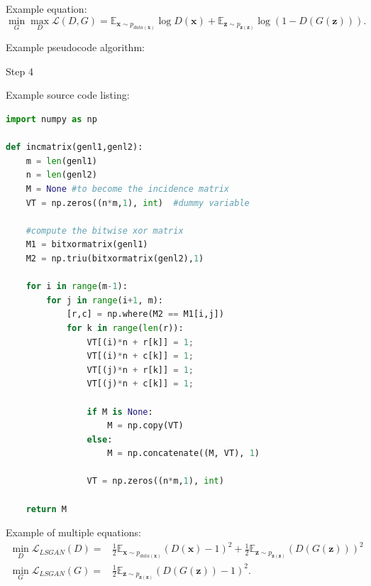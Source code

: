 \documentclass[12pt]{report} %
\begin{document}
Example equation:
\begin{equation} \label{eq:1}
    \min_{G} \max_{D} \mathcal{L}(D, G) = \mathbb{E}_{\boldsymbol{x} \sim p_{data(\boldsymbol{x})}} \log D(\boldsymbol{x}) + \mathbb{E}_{\boldsymbol{z} \sim p_{\boldsymbol{z}(\boldsymbol{z})}} \log (1-D(G(\boldsymbol{z}))).
\end{equation}

Example pseudocode algorithm:

\begin{algorithm}[H] \label{alg:1}
\DontPrintSemicolon %
 Step 4\;
 \caption{Training process for Algorithm 1...}
\end{algorithm}
\newpage
Example source code listing:
\begin{lstlisting}[language=Python, caption=Python example]
import numpy as np
 
def incmatrix(genl1,genl2):
    m = len(genl1)
    n = len(genl2)
    M = None #to become the incidence matrix
    VT = np.zeros((n*m,1), int)  #dummy variable
 
    #compute the bitwise xor matrix
    M1 = bitxormatrix(genl1)
    M2 = np.triu(bitxormatrix(genl2),1) 
 
    for i in range(m-1):
        for j in range(i+1, m):
            [r,c] = np.where(M2 == M1[i,j])
            for k in range(len(r)):
                VT[(i)*n + r[k]] = 1;
                VT[(i)*n + c[k]] = 1;
                VT[(j)*n + r[k]] = 1;
                VT[(j)*n + c[k]] = 1;
 
                if M is None:
                    M = np.copy(VT)
                else:
                    M = np.concatenate((M, VT), 1)
 
                VT = np.zeros((n*m,1), int)
 
    return M
\end{lstlisting}

Example of multiple equations:
\begin{align} \label{eq:2}
    \min_{D} \mathcal{L}_{LSGAN}(D) = & \frac{1}{2}\mathbb{E}_{\boldsymbol{x} \sim p_{data(\boldsymbol{x})}} (D(\boldsymbol{x}) - 1)^2 + \frac{1}{2}\mathbb{E}_{\boldsymbol{z} \sim p_{\boldsymbol{z}(\boldsymbol{z})}} (D(G(\boldsymbol{z})))^2
    \\
    \min_{G} \mathcal{L}_{LSGAN}(G) = & \frac{1}{2}\mathbb{E}_{\boldsymbol{z} \sim p_{\boldsymbol{z}(\boldsymbol{z})}} (D(G(\boldsymbol{z}))-1)^2.
\end{align}
\end{document}

